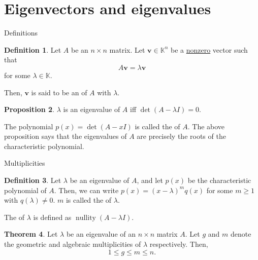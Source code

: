 \documentclass[dvipsnames]{beamer}
\DeclareMathOperator{\nullity}{nullity}
\theoremstyle{definition}
\newtheorem{thm}{Theorem}
\newtheorem{defn}[thm]{Definition}
\newtheorem{prop}[thm]{Proposition}
\let\ge\geqslant
\let\le\leqslant
\begin{document}
\section{Eigenvectors and eigenvalues}
\begin{frame}{Definitions}
    \begin{defn}
        Let $A$ be an $n \times n$ matrix. \pause Let $\mathbf{v} \in \mathbb{K}^{n}$ be a \underline{nonzero} vector such that \pause
        \begin{equation*} 
            A \mathbf{v} = \lambda \mathbf{v}
        \end{equation*}
        for some $\lambda \in \mathbb{K}$. \pause

        Then, $\mathbf{v}$ is said to be an  of $A$ with  $\lambda$.
    \end{defn} \pause

    \begin{prop}
        $\lambda$ is an eigenvalue of $A$ iff $\det(A - \lambda I) = 0$.
    \end{prop} \pause

    The polynomial $p(x) = \det(A - xI)$ is called the  of $A$. \pause The above proposition says that the eigenvalues of $A$ are precisely the roots of the characteristic polynomial.
\end{frame}
\begin{frame}{Multiplicities}
    \begin{defn}
        Let $\lambda$ be an eigenvalue of $A$, and let $p(x)$ be the characteristic polynomial of $A$. \pause \newline
        Then, we can write $p(x) = (x - \lambda)^{m} q(x)$ for some $m \ge 1$ with $q(\lambda) \neq 0$. \pause \newline
        $m$ is called the  of $\lambda$. \pause

        The  of $\lambda$ is defined as $\nullity(A - \lambda I)$.
    \end{defn} \pause

    \begin{thm}
        Let $\lambda$ be an eigenvalue of an $n \times n$ matrix $A$. Let $g$ and $m$ denote the geometric and algebraic multiplicities of $\lambda$ respectively. Then,
        \begin{equation*} 
            1 \le g \le m \le n.
        \end{equation*}
    \end{thm}
\end{frame}
\end{document}
